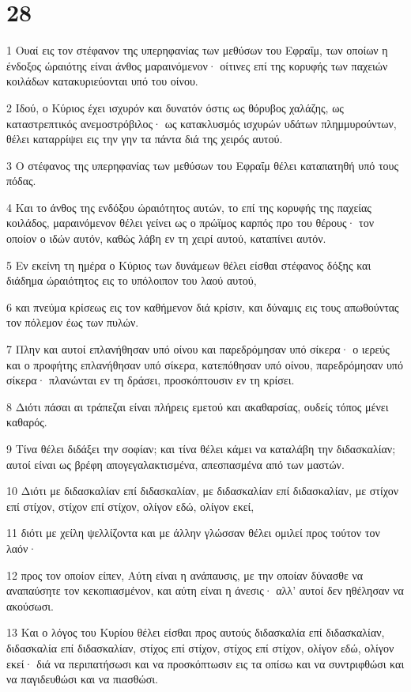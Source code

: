 \chapter{28}

\par 1 Ουαί εις τον στέφανον της υπερηφανίας των μεθύσων του Εφραΐμ, των οποίων η ένδοξος ώραιότης είναι άνθος μαραινόμενον· οίτινες επί της κορυφής των παχειών κοιλάδων κατακυριεύονται υπό του οίνου.
\par 2 Ιδού, ο Κύριος έχει ισχυρόν και δυνατόν όστις ως θόρυβος χαλάζης, ως καταστρεπτικός ανεμοστρόβιλος· ως κατακλυσμός ισχυρών υδάτων πλημμυρούντων, θέλει καταρρίψει εις την γην τα πάντα διά της χειρός αυτού.
\par 3 Ο στέφανος της υπερηφανίας των μεθύσων του Εφραΐμ θέλει καταπατηθή υπό τους πόδας.
\par 4 Και το άνθος της ενδόξου ώραιότητος αυτών, το επί της κορυφής της παχείας κοιλάδος, μαραινόμενον θέλει γείνει ως ο πρώϊμος καρπός προ του θέρους· τον οποίον ο ιδών αυτόν, καθώς λάβη εν τη χειρί αυτού, καταπίνει αυτόν.
\par 5 Εν εκείνη τη ημέρα ο Κύριος των δυνάμεων θέλει είσθαι στέφανος δόξης και διάδημα ώραιότητος εις το υπόλοιπον του λαού αυτού,
\par 6 και πνεύμα κρίσεως εις τον καθήμενον διά κρίσιν, και δύναμις εις τους απωθούντας τον πόλεμον έως των πυλών.
\par 7 Πλην και αυτοί επλανήθησαν υπό οίνου και παρεδρόμησαν υπό σίκερα· ο ιερεύς και ο προφήτης επλανήθησαν υπό σίκερα, κατεπόθησαν υπό οίνου, παρεδρόμησαν υπό σίκερα· πλανώνται εν τη δράσει, προσκόπτουσιν εν τη κρίσει.
\par 8 Διότι πάσαι αι τράπεζαι είναι πλήρεις εμετού και ακαθαρσίας, ουδείς τόπος μένει καθαρός.
\par 9 Τίνα θέλει διδάξει την σοφίαν; και τίνα θέλει κάμει να καταλάβη την διδασκαλίαν; αυτοί είναι ως βρέφη απογεγαλακτισμένα, απεσπασμένα από των μαστών.
\par 10 Διότι με διδασκαλίαν επί διδασκαλίαν, με διδασκαλίαν επί διδασκαλίαν, με στίχον επί στίχον, στίχον επί στίχον, ολίγον εδώ, ολίγον εκεί,
\par 11 διότι με χείλη ψελλίζοντα και με άλλην γλώσσαν θέλει ομιλεί προς τούτον τον λαόν·
\par 12 προς τον οποίον είπεν, Αύτη είναι η ανάπαυσις, με την οποίαν δύνασθε να αναπαύσητε τον κεκοπιασμένον, και αύτη είναι η άνεσις· αλλ' αυτοί δεν ηθέλησαν να ακούσωσι.
\par 13 Και ο λόγος του Κυρίου θέλει είσθαι προς αυτούς διδασκαλία επί διδασκαλίαν, διδασκαλία επί διδασκαλίαν, στίχος επί στίχον, στίχος επί στίχον, ολίγον εδώ, ολίγον εκεί· διά να περιπατήσωσι και να προσκόπτωσιν εις τα οπίσω και να συντριφθώσι και να παγιδευθώσι και να πιασθώσι.
